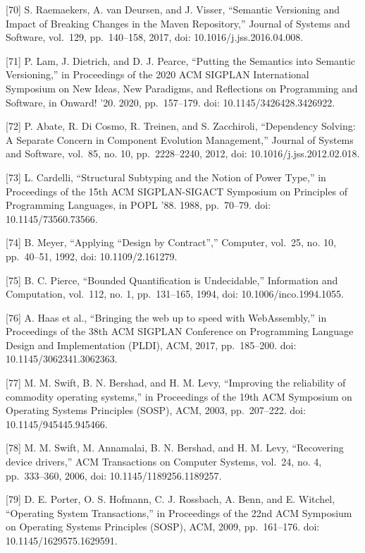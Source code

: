 {[}70{]} S. Raemaekers, A. van Deursen, and J. Visser, ``Semantic Versioning and
Impact of Breaking Changes in the Maven Repository,'' Journal of Systems and
Software, vol.~129, pp.~140--158, 2017, doi: 10.1016/j.jss.2016.04.008.

{[}71{]} P. Lam, J. Dietrich, and D. J. Pearce, ``Putting the Semantics into Semantic
Versioning,'' in Proceedings of the 2020 ACM SIGPLAN International Symposium on New
Ideas, New Paradigms, and Reflections on Programming and Software, in Onward! '20.
2020, pp.~157--179. doi: 10.1145/3426428.3426922.

{[}72{]} P. Abate, R. Di Cosmo, R. Treinen, and S. Zacchiroli, ``Dependency Solving:
A Separate Concern in Component Evolution Management,'' Journal of Systems and
Software, vol.~85, no. 10, pp.~2228--2240, 2012, doi: 10.1016/j.jss.2012.02.018.

{[}73{]} L. Cardelli, ``Structural Subtyping and the Notion of Power Type,'' in
Proceedings of the 15th ACM SIGPLAN-SIGACT Symposium on Principles of Programming
Languages, in POPL '88. 1988, pp.~70--79. doi: 10.1145/73560.73566.

{[}74{]} B. Meyer, ``Applying ``Design by Contract'','' Computer, vol.~25, no. 10,
pp.~40--51, 1992, doi: 10.1109/2.161279.

{[}75{]} B. C. Pierce, ``Bounded Quantification is Undecidable,'' Information and
Computation, vol.~112, no. 1, pp.~131--165, 1994, doi: 10.1006/inco.1994.1055.

{[}76{]} A. Haas et al., ``Bringing the web up to speed with WebAssembly,'' in
Proceedings of the 38th ACM SIGPLAN Conference on Programming Language Design and
Implementation (PLDI), ACM, 2017, pp.~185--200. doi: 10.1145/3062341.3062363.

{[}77{]} M. M. Swift, B. N. Bershad, and H. M. Levy, ``Improving the reliability of
commodity operating systems,'' in Proceedings of the 19th ACM Symposium on Operating
Systems Principles (SOSP), ACM, 2003, pp.~207--222. doi: 10.1145/945445.945466.

{[}78{]} M. M. Swift, M. Annamalai, B. N. Bershad, and H. M. Levy, ``Recovering
device drivers,'' ACM Transactions on Computer Systems, vol.~24, no. 4, pp.~333--360,
2006, doi: 10.1145/1189256.1189257.

{[}79{]} D. E. Porter, O. S. Hofmann, C. J. Rossbach, A. Benn, and E. Witchel,
``Operating System Transactions,'' in Proceedings of the 22nd ACM Symposium on
Operating Systems Principles (SOSP), ACM, 2009, pp.~161--176. doi: 10.1145/1629575.1629591.


